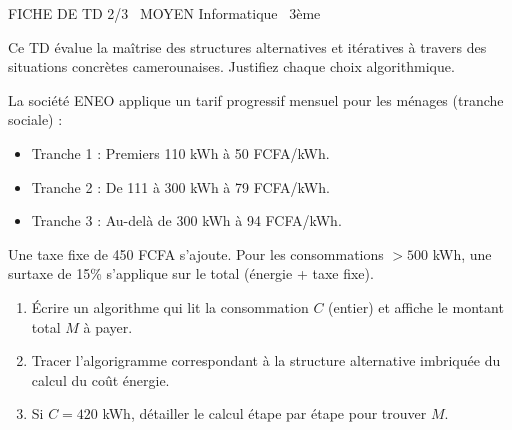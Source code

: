 \documentclass[11pt]{article}
\begin{document}
\begin{tcolorbox}[enhanced,colback=popink,colframe=popink,arc=10pt,boxrule=0pt,left=12pt,right=12pt,top=9pt,bottom=9pt]
{\color{white}\popxbold\small FICHE DE TD 2/3 \textbullet\ MOYEN \hfill Informatique \textbullet\ 3ème\par}
\end{tcolorbox}
\vspace{4pt}
Ce TD évalue la maîtrise des structures alternatives et itératives à travers des situations concrètes camerounaises. Justifiez chaque choix algorithmique.

\begin{exercice}
La société ENEO applique un tarif progressif mensuel pour les ménages (tranche sociale) :
\begin{itemize}
    \item Tranche 1 : Premiers 110 kWh à 50 FCFA/kWh.
    \item Tranche 2 : De 111 à 300 kWh à 79 FCFA/kWh.
    \item Tranche 3 : Au-delà de 300 kWh à 94 FCFA/kWh.
\end{itemize}
Une taxe fixe de 450 FCFA s'ajoute. Pour les consommations $> 500$ kWh, une surtaxe de 15\% s'applique sur le total (énergie + taxe fixe).
\begin{enumerate}
    \item Écrire un algorithme qui lit la consommation $C$ (entier) et affiche le montant total $M$ à payer.
    \item Tracer l'algorigramme correspondant à la structure alternative imbriquée du calcul du coût énergie.
    \item Si $C = 420$ kWh, détailler le calcul étape par étape pour trouver $M$.
\end{enumerate}
\end{exercice}
\end{document}
